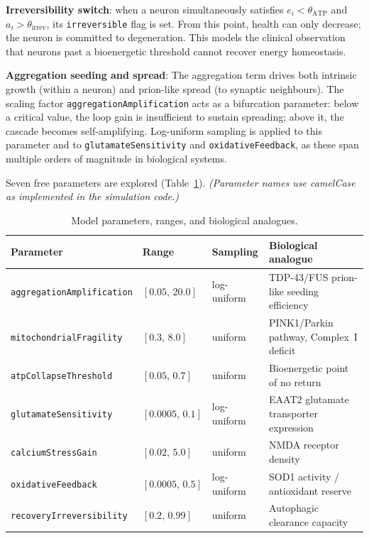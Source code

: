 \documentclass[12pt,a4paper]{article}
\begin{document}
\textbf{Irreversibility switch}: when a neuron simultaneously satisfies $e_i <
\theta_{\text{ATP}}$ and $a_i > \theta_{\text{irrev}}$, its \texttt{irreversible} flag is set.
From this point, health can only decrease; the neuron is committed to degeneration. This models
the clinical observation that neurons past a bioenergetic threshold cannot recover energy
homeostasis.

\textbf{Aggregation seeding and spread}: The aggregation term drives both intrinsic growth
(within a neuron) and prion-like spread (to synaptic neighbours). The scaling factor
\texttt{aggregationAmplification} acts as a bifurcation parameter: below a critical value, the
loop gain is insufficient to sustain spreading; above it, the cascade becomes self-amplifying.
Log-uniform sampling is applied to this parameter and to \texttt{glutamateSensitivity} and
\texttt{oxidativeFeedback}, as these span multiple orders of magnitude in biological systems.

Seven free parameters are explored (Table~\ref{tab:params}). \textit{(Parameter names use
camelCase as implemented in the simulation code.)}

\begin{table}[H]
\centering
\caption{Model parameters, ranges, and biological analogues.}
\label{tab:params}
\begin{tabularx}{\textwidth}{lllX}
\toprule
\textbf{Parameter} & \textbf{Range} & \textbf{Sampling} & \textbf{Biological analogue}\\
\midrule
\texttt{aggregationAmplification} & $[0.05,\,20.0]$ & log-uniform &
  TDP-43/FUS prion-like seeding efficiency\\
\texttt{mitochondrialFragility} & $[0.3,\,8.0]$ & uniform &
  PINK1/Parkin pathway, Complex~I deficit\\
\texttt{atpCollapseThreshold} & $[0.05,\,0.7]$ & uniform &
  Bioenergetic point of no return\\
\texttt{glutamateSensitivity} & $[0.0005,\,0.1]$ & log-uniform &
  EAAT2 glutamate transporter expression\\
\texttt{calciumStressGain} & $[0.02,\,5.0]$ & uniform &
  NMDA receptor density\\
\texttt{oxidativeFeedback} & $[0.0005,\,0.5]$ & log-uniform &
  SOD1 activity / antioxidant reserve\\
\texttt{recoveryIrreversibility} & $[0.2,\,0.99]$ & uniform &
  Autophagic clearance capacity\\
\bottomrule
\end{tabularx}
\end{table}
\end{document}
